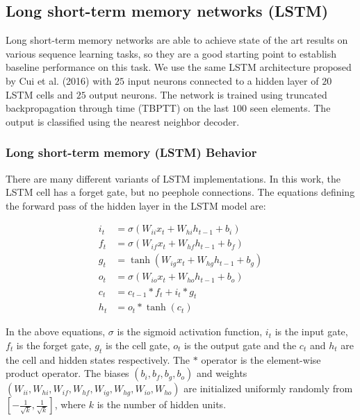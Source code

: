 \documentclass{article}
\begin{document}
\subsection*{Long short-term memory networks (LSTM)}

Long short-term memory \cite{hochreiter1997long} networks are able to achieve state of the art results on various sequence learning tasks, so they are a good starting point to establish baseline performance on this task. We use the same LSTM architecture proposed by Cui et al. (2016) with $25$ input neurons connected to a hidden layer of $20$ LSTM cells and $25$ output neurons. The network is trained using truncated backpropagation through time (TBPTT) \cite{mozer1995focused, sutskever2013training} on the last $100$ seen elements. The output is classified using the nearest neighbor decoder.

\subsubsection*{Long short-term memory (LSTM) Behavior}
There are many different variants of LSTM implementations. In this work, the LSTM cell has a forget gate, but no peephole connections. The equations defining the forward pass of the hidden layer in the LSTM model are:

\begin{align}
    i_t &= \sigma\left(W_{ii}x_t + W_{hi}h_{t-1} + b_i\right)\\
    f_t &= \sigma\left(W_{if}x_t + W_{hf}h_{t-1} + b_f\right)\\
    g_t &= \tanh\left(W_{ig}x_t + W_{hg}h_{t-1} + b_g\right)\\
    o_t &= \sigma\left(W_{io}x_t + W_{ho}h_{t-1} + b_o\right)\\
    c_t &= c_{t-1}\ast f_t + i_t \ast g_t\\
    h_t &= o_t \ast \tanh\left(c_t\right)
\end{align}

In the above equations, $\sigma$ is the sigmoid activation function, $i_t$ is the input gate, $f_t$ is the forget gate, $g_t$ is the cell gate, $o_t$ is the output gate and the $c_t$ and $h_t$ are the cell and hidden states respectively. The $\ast$ operator is the element-wise product operator. The biases $\left(b_i, b_f, b_g, b_o\right)$ and weights $\left(W_{ii}, W_{hi}, W_{if}, W_{hf}, W_{ig}, W_{hg},W_{io}, W_{ho}\right)$ are initialized uniformly randomly from $\left[-\frac{1}{\sqrt{k}}, \frac{1}{\sqrt{k}}\right]$, where $k$ is the number of hidden units. \cite{jozefowicz2015empirical} 
\end{document}

